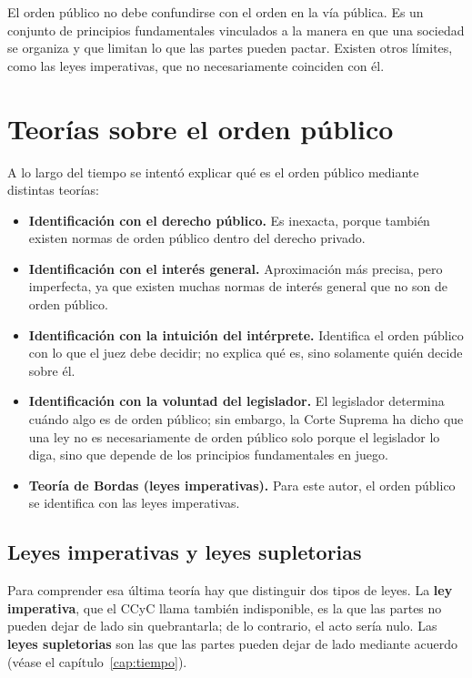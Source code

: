 \documentclass[12pt,oneside]{book}
\begin{document}
El orden público no debe confundirse con el orden en la vía pública. Es un conjunto de principios fundamentales vinculados a la manera en que una sociedad se organiza y que limitan lo que las partes pueden pactar. Existen otros límites, como las leyes imperativas, que no necesariamente coinciden con él.

\section{Teorías sobre el orden público}

A lo largo del tiempo se intentó explicar qué es el orden público mediante distintas teorías:

\begin{itemize}
\item \textbf{Identificación con el derecho público.} Es inexacta, porque también existen normas de orden público dentro del derecho privado.
\item \textbf{Identificación con el interés general.} Aproximación más precisa, pero imperfecta, ya que existen muchas normas de interés general que no son de orden público.
\item \textbf{Identificación con la intuición del intérprete.} Identifica el orden público con lo que el juez debe decidir; no explica qué es, sino solamente quién decide sobre él.
\item \textbf{Identificación con la voluntad del legislador.} El legislador determina cuándo algo es de orden público; sin embargo, la Corte Suprema ha dicho que una ley no es necesariamente de orden público solo porque el legislador lo diga, sino que depende de los principios fundamentales en juego.
\item \textbf{Teoría de Bordas (leyes imperativas).} Para este autor, el orden público se identifica con las leyes imperativas. %
\end{itemize}

\subsection{Leyes imperativas y leyes supletorias}

Para comprender esa última teoría hay que distinguir dos tipos de leyes. La \textbf{ley imperativa}, que el CCyC llama también indisponible, es la que las partes no pueden dejar de lado sin quebrantarla; de lo contrario, el acto sería nulo. Las \textbf{leyes supletorias} son las que las partes pueden dejar de lado mediante acuerdo (véase el capítulo~\ref{cap:tiempo}).
\end{document}
